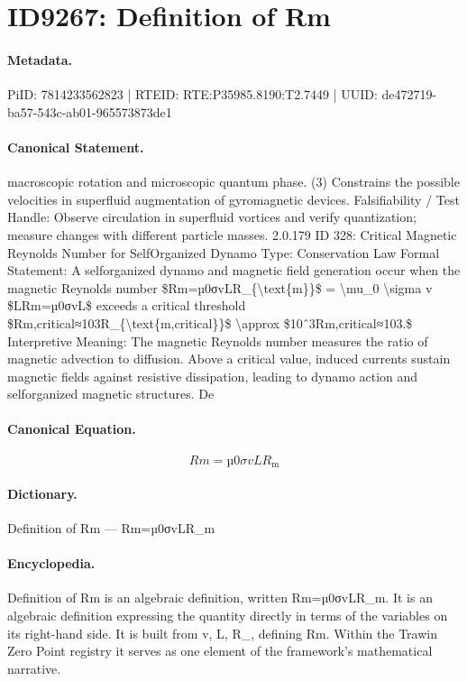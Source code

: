 \section*{ID9267: Definition of Rm}
\paragraph{Metadata.}
PiID: 7814233562823 | RTEID: RTE:P35985.8190:T2.7449 | UUID: de472719-ba57-543c-ab01-965573873de1

\paragraph{Canonical Statement.}
macroscopic rotation and microscopic quantum phase. (3) Constrains the possible velocities in superfluid augmentation of gyromagnetic devices. Falsifiability / Test Handle: Observe circulation in superfluid vortices and verify quantization; measure changes with different particle masses. 2.0.179 ID 328: Critical Magnetic Reynolds Number for SelfOrganized Dynamo Type: Conservation Law Formal Statement: A selforganized dynamo and magnetic field generation occur when the magnetic Reynolds number \$Rm=µ0σvLR\_\{\textbackslash{}text\{m\}\}\$ = \textbackslash{}mu\_0 \textbackslash{}sigma v \$LRm=µ0σvL\$ exceeds a critical threshold \$Rm,critical≈103R\_\{\textbackslash{}text\{m,critical\}\}\$ \textbackslash{}approx \$10ˆ3Rm,critical≈103.\$ Interpretive Meaning: The magnetic Reynolds number measures the ratio of magnetic advection to diffusion. Above a critical value, induced currents sustain magnetic fields against resistive dissipation, leading to dynamo action and selforganized magnetic structures. De

\paragraph{Canonical Equation.}
\[
Rm=µ0σvLR_{\text{m}}
\]

\paragraph{Dictionary.}
Definition of Rm — Rm=µ0σvLR\_m

\paragraph{Encyclopedia.}
Definition of Rm is an algebraic definition, written Rm=µ0σvLR\_m. It is an algebraic definition expressing the quantity directly in terms of the variables on its right-hand side. It is built from v, L, R\_, defining Rm. Within the Trawin Zero Point registry it serves as one element of the framework's mathematical narrative.
